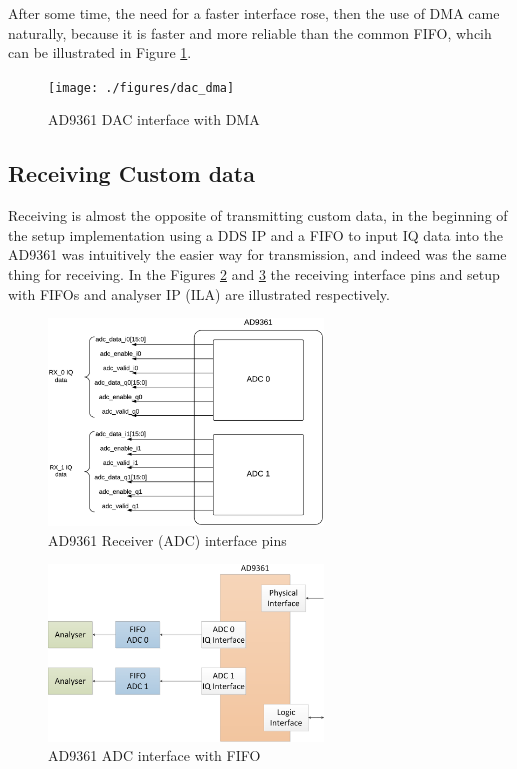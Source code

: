  After some time, the need for a faster interface rose, then the use of DMA
came naturally, because it is faster and more reliable than the common FIFO,
whcih can be illustrated in Figure \ref{fig:ad9361txdma}.

\begin{figure}[htbp]
    \centering
    \texttt{[image: ./figures/dac\_dma]}
    \caption{ AD9361 DAC interface with DMA
    \label{fig:ad9361txdma}}
\end{figure}

\subsection{Receiving Custom data}

Receiving is almost the opposite of transmitting custom data, in the beginning
of the setup implementation using a DDS IP and a FIFO to input IQ data into the
AD9361 was intuitively the easier way for transmission, and indeed was the same
thing for receiving. In the Figures \ref{fig:rxpins} and \ref{fig:ad9361rxfifo}
the receiving interface pins and setup with FIFOs and analyser IP (ILA) are
illustrated respectively.

\begin{figure}[htbp]
    \centering
    \includegraphics[width=0.65\textwidth]{./figures/ad9361rx_pins}
    \caption{ AD9361 Receiver (ADC) interface pins
    \label{fig:rxpins}}
\end{figure}

\begin{figure}[htbp]
    \centering
    \includegraphics[width=0.65\textwidth]{./figures/adc_fifo}
    \caption{ AD9361 ADC interface with FIFO
    \label{fig:ad9361rxfifo}}
\end{figure}

